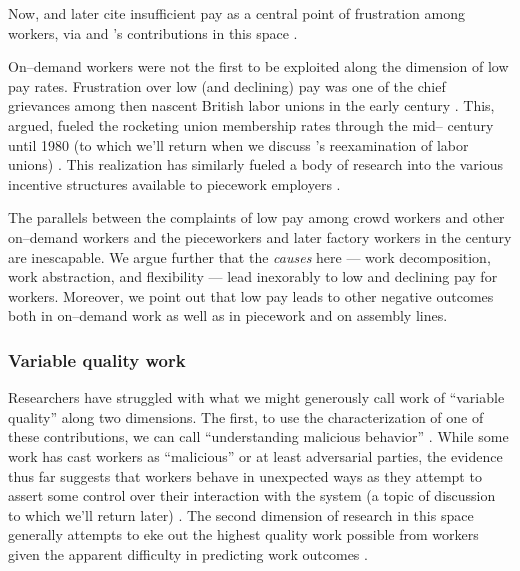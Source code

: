\documentclass[trackingWork]{subfiles}
\begin{document}
{Now, \citeauthor{turkopticon}
and later
\citeauthor{dynamo} cite insufficient pay as a central point of frustration among workers,
via \citeauthor{irani2015cultural} and \citeauthor{dawnDigitalSweatshopCushing}'s contributions in this space
\cite{dynamo,irani2015cultural,dawnDigitalSweatshopCushing,turkopticon}.

On--demand workers were not the first to be exploited along the dimension of low pay rates.
Frustration over low (and declining) pay was one of the chief grievances among then nascent
British labor unions in the early  century
\cite{turner1952trade}.
This, \citeauthor{ebbinghaus1999institutions} argued,
fueled the rocketing union membership rates through the mid-- century until 1980
(to which we'll return when we discuss \citeauthor{levi2009union}'s reexamination of labor unions)
\cite{ebbinghaus1999institutions,levi2009union}.
This realization has similarly fueled a body of research into
the various incentive structures available to piecework employers
\cite{roy1953work}.


The parallels between the complaints of low pay among crowd workers and other on--demand workers
and the pieceworkers and later factory workers in the  century
are inescapable.
We argue further that the \textit{causes} here
--- work decomposition,
work abstraction, and
flexibility ---
lead inexorably to low and declining pay for workers.
Moreover, we point out that low pay leads to other negative outcomes both
in on--demand work
as well as
in piecework and on assembly lines.

\subsubsection{Variable quality work}\label{sec:varQualWork}
Researchers have struggled with what we might generously call work of ``variable quality''
along two dimensions.
The first, to use the characterization of one of these contributions, we can call
``understanding malicious behavior''
\cite{MaliciousCrowdworkersGadiraju}.
While some work has cast workers as ``malicious'' or at least adversarial parties,
the evidence thus far suggests that
workers behave in unexpected ways as they attempt to assert some control over their interaction with the system
(a topic of discussion to which we'll return later)
\cite{uberAlgorithm}.
The second dimension of research in this space generally attempts
to eke out the highest quality work possible from workers
given the apparent difficulty in predicting work outcomes
\cite{embracingErrorKrishna}.




}
\end{document}
